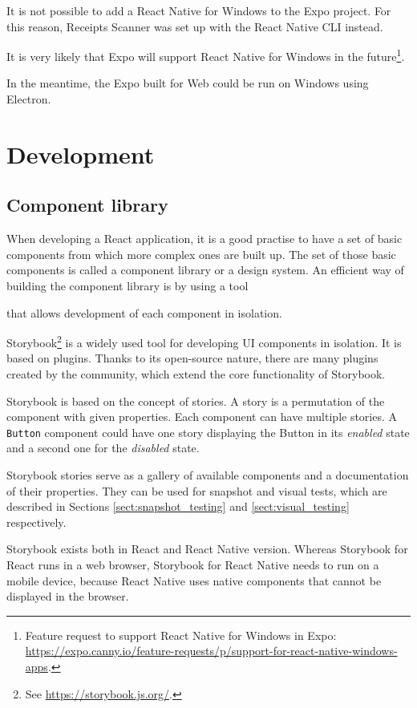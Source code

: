 \documentclass[
  digital, %
  table,   %
  oneside, %
  lof,     %
  lot,     %
]{fithesis3}
\begin{document}
It is not possible to add a React Native for Windows to the Expo project. For this reason, Receipts Scanner was set up with the React Native CLI instead.

It is very likely that Expo will support React Native for Windows in the future\footnote{Feature request to support React Native for Windows in Expo: \url{https://expo.canny.io/feature-requests/p/support-for-react-native-windows-apps}.}.

In the meantime, the Expo built for Web could be run on Windows using Electron.

\chapter{Development}
\section{Component library}
When developing a React application, it is a good practise to have a set of basic components from which more complex ones are built up. The set of those basic components is called a component library or a design system. An efficient way of building the component library is by using a tool


that allows development of each component in isolation.

Storybook\footnote{See \url{https://storybook.js.org/}.} is a widely used tool for developing UI components in isolation. It is based on plugins. Thanks to its open-source nature, there are many plugins created by the community, which extend the core functionality of Storybook.

Storybook is based on the concept of stories. A story is a permutation of the component with given properties. Each component can have multiple stories. A \texttt{Button} component could have one story displaying the Button in its \textit{enabled} state and a second one for the \textit{disabled} state.

Storybook stories serve as a gallery of available components and a documentation of their properties. They can be used for snapshot and visual tests, which are described in Sections \ref{sect:snapshot_testing} and \ref{sect:visual_testing} respectively.

Storybook exists both in React and React Native version. 
Whereas Storybook for React runs in a web browser, Storybook for React Native needs to run on a mobile device, because React Native uses native components that cannot be displayed in the browser. 
\end{document}
